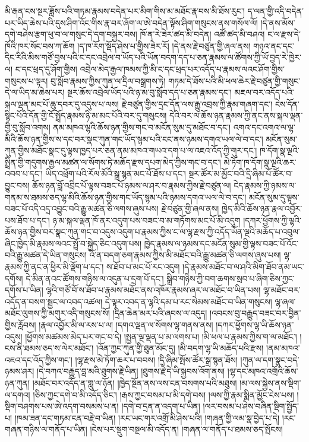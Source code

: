 \documentclass{article}
\begin{document}
མི་རྒན་ངས་སྔར་ཟློས་པའི་གཏམ་རྣམས་བདེན་པར་མིག་གིས་མ་མཐོང་རྣ་བས་མི་ཐོས་རུང་། ད་ལན་གྱི་འདི་བདེན་པར་ཡིད་ཆེས་པའི་དུས་ཤིག་འོང་གིས་རྣ་བར་ཞོག་ལ་ཨེ་བདེན་ལྟོས་ཤིག་གསུངས་ནས་གསོལ་ལོ། །དེ་ནས་མོས་དགེ་བཤེས་རྩག་ཕུ་བ་ལ་གསུང་དེ་དག་བསྐྱར་བས། ཁོ་ན་རེ་ཟེར་ཚད་མི་བདེན། འཚོ་ཚད་མི་བཤའ། ང་ལ་རྫས་དེ་ཁོའི་ཁར་སོང་བས་ཀ་ཆོག །ད་ཁ་རོག་སྡོད་ཤེས་པ་གྱིས་ཟེར་རོ། །དེ་ནས་རྗེ་བཙུན་གྱི་ཞལ་ནས། གཉའ་ནང་དང་དིང་རིའི་མིས་གཙོ་བྱས་པའི་ང་དང་འབྲེལ་བ་ཡོད་པའི་ཡོན་བདག་དད་པ་ཅན་རྣམས་ལ་ཚོགས་ཀྱི་ཡོ་བྱད་རེ་ཁྱེར་ལ། ང་དང་ཕྲད་དུ་ཤོག་གྱིས། འབྲེལ་མེད་རྒྱལ་ཁམས་ཀྱི་མི་ང་དང་ཕྲད་པར་འདོད་པ་རྣམས་ལའང་ཤོག་གྱིས་གསུངས་པ་ལྟར། བུ་སློབ་རྣམས་ཀྱིས་ཀུན་ལ་དྲིལ་བསྒྲགས་ཏེ། གཏམ་དེ་ཐོས་པའི་མི་ཕལ་ཆེར་རྗེ་བཙུན་གྱི་གསུང་དེ་ལ་ཡིད་མ་ཆེས་པར། སྔར་ཆོས་འབྲེལ་ཡོད་པའི་ཉ་མ་བུ་སློབ་དད་པ་ཅན་རྣམས་དང་། མཇལ་བར་འདོད་པའི་སྐལ་ལྡན་མང་པོ་ཆུ་དབར་དུ་འདུས་པ་ལས། རྗེ་བཙུན་གྱིས་དྲང་དོན་ལས་རྒྱུ་འབྲས་ཀྱི་རྣམ་གཞག་དང་། ངེས་དོན་སྙིང་པོའི་དོན་གྱི་ངོ་སྤྲོད་རྣམས་ཉི་མ་མང་པོའི་བར་དུ་གསུངས། དེའི་བར་ལ་ཆོས་ཉན་རྣམས་ཀྱི་ནང་ནས་སྐལ་ལྡན་གྱི་བུ་སློབ་འགས། ནམ་མཁའ་ལྷའི་ཆོས་ཉན་གྱིས་གང་བ་མངོན་སུམ་དུ་མཐོང་བ་དང་། འགའ་དང་འགའ་ལ་ལྷ་མིའི་ཆོས་ཉན་གྱིས་ས་དང་བར་སྣང་ཀུན་གང་ཡོད་སྙམ་པའི་ངང་ནས་ཉམས་དགའ་ཡལ་ལེ་བ་དང་། མངོན་སུམ་ཀུན་གྱིས་མཐོང་སྣང་དུ་ལྟས་ཁྱད་པར་ཅན་ནམ་མཁའ་གཡའ་དག་པ་ལ་འཇའ་འོད་ཀྱི་གུར་དང་། ཁ་དོག་སྣ་ལྔའི་སྤྲིན་གྱི་གདུགས་རྒྱལ་མཚན་ལ་སོགས་ཏེ་མཆོད་རྫས་དཔག་མེད་ཀྱིས་གང་བ་དང་། མེ་ཏོག་ཁ་དོག་སྣ་ལྔའི་ཆར་འབབ་པ་དང་། ཡིད་འཕྲོག་པའི་རོལ་མོའི་སྒྲ་སྙན་མང་པོ་ཐོས་པ་དང་། སྔར་ཚོར་མ་མྱོང་བའི་དྲི་ཞིམ་པོ་ཚོར་བ་བྱུང་བས། ཆོས་ཉན་བློ་འབྲིང་པོ་ལྟས་བཟང་པོ་ཉམས་ལ་ཤར་བ་རྣམས་ཀྱིས་རྗེ་བཙུན་ལ། ངེད་རྣམས་ཀྱི་ཉམས་ལ་གནམ་ས་ཐམས་ཅད་ལྷ་མིའི་ཆོས་ཉན་གྱིས་གང་ཡོད་སྙམ་པའི་ཉམས་དགའ་ཡལ་ལེ་བ་དང་། མངོན་སུམ་དུ་ལྟས་བཟང་པོ་འདི་འདྲ་འབྱུང་བའི་རྒྱུ་མཚན་ཅི་ལགས་ཞུས་པས། རྗེ་བཙུན་གྱི་ཞལ་ནས། ཁྱེད་མིའི་ཆོས་ཉན་རྣལ་འབྱོར་པས་ཐོབ་པ་དང་། ཉ་མ་སྐལ་ལྡན་ཁོ་ནར་འདུག་པས་བཟང་བ་མ་གཏོགས་མང་པོ་མི་འདུག །དཀར་ཕྱོགས་ཀྱི་ལྷའི་ཆོས་ཉན་གྱིས་བར་སྣང་ཀུན་གང་བ་འདུས་འདུག་པ་རྣམས་ཀྱིས་ང་ལ་ལྷ་རྫས་ཀྱི་འདོད་ཡོན་ལྔའི་མཆོད་པ་འབུལ་ཞིང་ཁྱེད་མི་རྣམས་ལའང་སྤྲོ་བ་སྐྱེད་ཅིང་འདུག་པས། ཁྱེད་རྣམས་ལ་ཉམས་དང་མངོན་སུམ་གྱི་ལྟས་བཟང་པོ་འོང་བའི་རྒྱུ་མཚན་དེ་ཡིན་གསུངས། འོ་ན་བདག་ཅག་རྣམས་ཀྱིས་མི་མཐོང་བའི་རྒྱུ་མཚན་ཅི་ལགས་ཞུས་པས། ལྷ་རྣམས་ཀྱི་ནང་ན་ཕྱིར་མི་ལྡོག་པ་དང་། ས་ཐོབ་པ་མང་པོ་རང་འདུག །དེ་རྣམས་མཐོང་བ་ལ་ཤའི་མིག་ཐོབ་ནམ་ཡང་དགོས། དེ་མིན་ནའང་ཚོགས་གཉིས་ལ་འདུན་པ་དྲག་པོ་དང་། སྒྲིབ་གཉིས་ཀྱི་བག་ཆགས་སྲབ་པ་ཞིག་ཅིས་ཀྱང་དགོས་པ་ཡིན། ལྷའི་གཙོ་བོ་ས་ཐོབ་པ་རྣམས་མཐོང་ནས་འཁོར་རྣམས་ཞར་ལ་མཐོང་བ་ཡིན་པས། ལྷ་མཐོང་བར་འདོད་ན་བསག་སྦྱང་ལ་འབད་འཚལ། དེ་ལྟར་འབད་ན་ལྷའི་དམ་པ་རང་སེམས་མཐོང་བ་ཡིན་གསུངས། ལྷ་ཞལ་མཐོང་ལུགས་ཀྱི་མགུར་འདི་གསུངས་སོ། །དྲིན་ཆེན་མར་པའི་ཞབས་ལ་འདུད། །འབངས་བུ་བརྒྱུད་བཟང་བར་བྱིན་གྱིས་རློབས། །རྣལ་འབྱོར་མི་ལ་རས་པ་ལ། །དགའ་ལྡན་ལ་སོགས་ལྷ་གནས་ནས། །དཀར་ཕྱོགས་ལྷ་ཡི་ཆོས་ཉན་འདུས། །ཕྱོགས་མཚམས་མེད་པར་གང་བ་དེ། །སྤྱན་ལྔ་ལྡན་པ་མ་ལགས་པ། །མི་ཕལ་པ་རྣམས་ཀྱིས་ག་ལ་མཐོང་། །ངས་ནི་ཐམས་ཅད་ས་ལེར་མཐོང་། །འོན་ཀྱང་ཀུན་གྱི་ཐུན་མོང་དུ། །མི་བདག་ལྷ་ཡི་མཆོད་པའི་རྫས། །ནམ་མཁའ་འཇའ་དང་འོད་ཀྱིས་གང་། །ལྷ་རྫས་མེ་ཏོག་ཆར་པ་བབས། །དྲི་ཞིམ་སྤོས་ཚོར་སྒྲ་སྙན་ཐོས། །ཀུན་ལ་དག་སྣང་བདེ་ཉམས་ཤར། །དེ་བཀའ་བརྒྱུད་བླ་མའི་ཐུགས་རྗེ་ཡིན། །ཐུགས་རྗེ་དེ་ཡི་སྐྱབས་འོག་ནས། །ལྷ་དང་མཁའ་འགྲོའི་ཆོས་ཉན་ཀུན། །མཐོང་བར་འདོད་ན་གླུ་ལ་ཉོན། །ཁྱེད་སྔོན་ནས་ལས་ངན་བསགས་པའི་མཐུས། །མ་ལས་སྐྱེས་ནས་སྡིག་ལ་དགའ། །ཅིས་ཀྱང་དགེ་བ་མི་འདོད་ཅིང་། །རྒས་ཀྱང་བསམ་པ་མི་དགེ་བས། །ལས་ཀྱི་རྣམ་སྨིན་མྱོང་ངེས་པས། །སྡིག་བཤགས་པས་ཨེ་འདག་བསམས་པ་ན། །དགེ་བ་དྲན་ན་འདག་པ་ཡིན། །ལར་བསམ་པ་ཤེས་བཞིན་སྡིག་སྤྱོད་པ། །ཁམ་ཟན་དང་གཏམ་ངན་བརྗེ་བ་ཡིན། །རང་ཡང་གར་འགྲོ་མི་ཤེས་པའི། །གཞན་གྱི་ལམ་སྣ་བྱེད་པ་དེ། །རང་གཞན་གཉིས་ལ་གནོད་པ་ཡིན། །ངེས་པར་སྡུག་བསྔལ་མི་འདོད་ན། །གཞན་ལ་གནོད་པ་ཐམས་ཅད་སྤོངས། 
\end{document}
